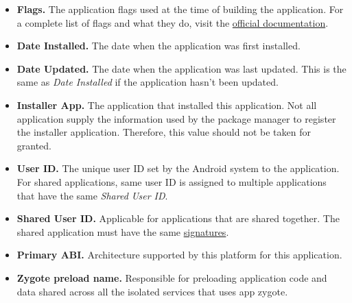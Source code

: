 \begin{itemize}
\begin{itemize}
        \item \textbf{Flags.} The application flags used at the time of building the application. For a complete list of
        flags and what they do, visit the
        \href{https://developer.android.com/reference/android/content/pm/ApplicationInfo\#flags}{official documentation}.

        \item \textbf{Date Installed.} The date when the application was first installed.

        \item \textbf{Date Updated.} The date when the application was last updated. This is the same as \textit{Date Installed}
        if the application hasn't been updated.

        \item \textbf{Installer App.} The application that installed this application. Not all application supply the information used by the
        package manager to register the installer application. Therefore, this value should not be taken for granted.

        \item \textbf{User ID.} The unique user ID set by the Android system to the application. For shared applications, same
        user ID is assigned to multiple applications that have the same \textit{Shared User ID}.

        \item \textbf{Shared User ID.} Applicable for applications that are shared together. The shared application must
        have the same \hyperref[subsec:signatures-tab]{signatures}.

        \item \textbf{Primary ABI.} Architecture supported by this platform for this application.

        \item \textbf{Zygote preload name.} Responsible for preloading application code and data shared across all the
        isolated services that uses app zygote.


\end{itemize}
\end{itemize}
